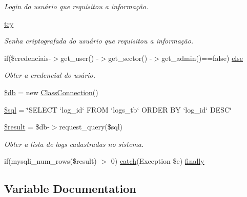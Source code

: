 \begin{DoxyCompactItemize}
\begin{DoxyCompactList}\small\item\em Login do usuário que requisitou a informação. \end{DoxyCompactList}\item 
\hyperlink{menu_2configuracoes_2logs_2index_8php_abe4cc9788f52e49485473dc699537388}{try}
\begin{DoxyCompactList}\small\item\em Senha criptografada do usuário que requisitou a informação. \end{DoxyCompactList}\item 
if(\$credenciais-\/$>$get\+\_\+user() -\/$>$get\+\_\+sector() -\/$>$get\+\_\+admin()==false) \hyperlink{menu_2configuracoes_2logs_2index_8php_a8f5108ee2efdbfcd6f3d53b8abcb6c09}{else}
\begin{DoxyCompactList}\small\item\em Obter a credencial do usário. \end{DoxyCompactList}\item 
\hyperlink{menu_2configuracoes_2logs_2index_8php_a1fa3127fc82f96b1436d871ef02be319}{\$db} = new \hyperlink{class_class_connection}{Class\+Connection}()
\item 
\hyperlink{menu_2configuracoes_2logs_2index_8php_a047170d6020a882807665812a27e2525}{\$sql} = \char`\"{}S\+E\+L\+E\+CT `log\+\_\+id` F\+R\+OM `logs\+\_\+tb` O\+R\+D\+ER BY `log\+\_\+id` D\+E\+SC\char`\"{}
\item 
\hyperlink{menu_2configuracoes_2logs_2index_8php_a112ef069ddc0454086e3d1e6d8d55d07}{\$result} = \$db-\/$>$request\+\_\+query(\$sql)
\begin{DoxyCompactList}\small\item\em Obter a lista de logs cadastradas no sistema. \end{DoxyCompactList}\item 
if(mysqli\+\_\+num\+\_\+rows(\$result) $>$ 0) \hyperlink{imprimir_2ficha_2index_8php_a8104793004944f01dd070fc8b1ade3c4}{catch}(Exception \$e) \hyperlink{menu_2configuracoes_2logs_2index_8php_af7cfe1f8cb9dba05c425311a444e3fb4}{finally}
\end{DoxyCompactItemize}


\subsection{Variable Documentation}
\mbox{\label{menu_2configuracoes_2logs_2index_8php_a26b9f9373f7bb79dfcf8a86dff086b45}} 
